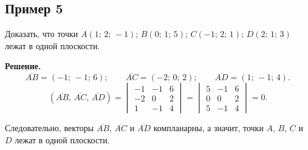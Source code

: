 \documentclass[12pt,a4paper]{article}
\begin{document}
\subsection*{Пример 5}

Доказать, что точки $A(1;\,2;\,-1)$; $B(0;\,1;\,5)$; $C(-1;\,2;\,1)$;
$D(2;\,1;\,3)$ лежат в одной плоскости.

\textbf{Решение.}
$$
\overline{AB} = (-1;\,-1;\,6); \qquad
\overline{AC} = (-2;\,0;\,2); \qquad
\overline{AD} = (1;\,-1;\,4).
$$
$$
(\overline{AB},\,\overline{AC},\,\overline{AD})
=
\begin{vmatrix}
  -1 & -1 & 6 \\
  -2 &  0 & 2 \\
  1 & -1 & 4
\end{vmatrix}
=
\begin{vmatrix}
  5 & -1 & 6 \\
  0 &  0 & 2 \\
  5 & -1 & 4
\end{vmatrix}
= 0.
$$

Следовательно, векторы $\overline{AB}$, $\overline{AC}$ и
$\overline{AD}$ компланарны, а значит, точки $A$, $B$, $C$ и $D$
лежат в одной плоскости.
\end{document}
